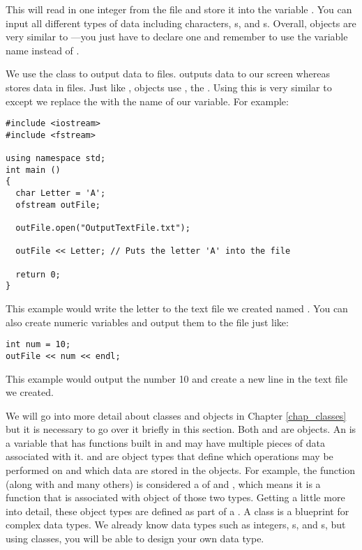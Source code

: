This will read in one integer from the file and store it into the variable . 
You can input all different types of data including characters, s, and s. 
Overall,  objects are very similar to ---you just have to declare one and remember to use the variable name instead of .


We use the  class to output data to files. 
 outputs data to our screen whereas  stores data in files. 
Just like ,  objects use \Code{<<}, the . 
Using this is very similar to  except we replace the  with the name of our variable. 
For example:

\noindent\begin{minipage}{\linewidth}\begin{lstlisting}		
#include <iostream> 
#include <fstream>
		
using namespace std;
int main ()
{
  char Letter = 'A';
  ofstream outFile;

  outFile.open("OutputTextFile.txt");

  outFile << Letter; // Puts the letter 'A' into the file

  return 0;
}
\end{lstlisting}\end{minipage}

This example would write the letter  to the text file we created named . 
You can also create numeric variables and output them to the file just like:
			
\noindent\begin{minipage}{\linewidth}\begin{lstlisting}
int num = 10;
outFile << num << endl;
\end{lstlisting}\end{minipage}		

This example would output the number 10 and create a new line in the text file we created. 

	
We will go into more detail about classes and objects in Chapter \ref{chap_classes} but it is necessary to go over it briefly in this section. 
Both  and  are objects. 
An  is a variable that has functions built in and may have multiple pieces of data associated with it. 
 and  are object types that define which operations may be performed on and which data are stored in the objects. 
For example, the function  (along with  and many others) is considered a  of  and , which means it is a function that is associated with object of those two types. 
Getting a little more into detail, these object types are defined as part of a . 
A class is a blueprint for complex data types. 
We already know data types such as integers, s, and s, but using classes, you will be able to design your own data type.

